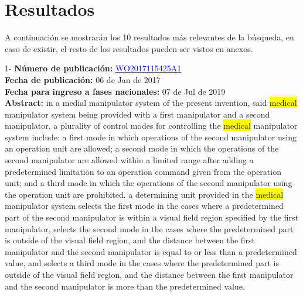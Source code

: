\chapter{Resultados}
 A continuación se mostrarán los 10 resultados más 
    relevantes de la búsqueda, en caso de existir, el resto de los resultados pueden ser vistos en anexos.
 
 \vspace{1cm}1- \textbf{Número de publicación:} \href{https://worldwide.espacenet.com/publicationDetails/biblio?DB=EPODOC&II=0&ND=3&adjacent=true&locale=en_EP&FT=D&date=20160331&CC=WO&NR=2017115425A1&KC=A1#}{\textcolor{blue}{WO2017115425A1}}\\ 
\textbf{Fecha de publicación:} 06 de Jan de 2017\\ 
\textbf{Fecha para ingreso a fases nacionales:} 07 de Jul de 2019\\ 
\textbf{Abstract:} in a medial manipulator system of the present invention, said \colorbox{yellow}{medical} manipulator system being provided with a first manipulator and a second manipulator, a plurality of control modes for controlling the \colorbox{yellow}{medical} manipulator system include: a first mode in which operations of the second manipulator using an operation unit are allowed; a second mode in which the operations of the second manipulator are allowed within a limited range after adding a predetermined limitation to an operation command given from the operation unit; and a third mode in which the operations of the second manipulator using the operation unit are prohibited. a determining unit provided in the \colorbox{yellow}{medical} manipulator system selects the first mode in the cases where a predetermined part of the second manipulator is within a visual field region specified by the first manipulator, selects the second mode in the cases where the predetermined part is outside of the visual field region, and the distance between the first manipulator and the second manipulator is equal to or less than a predetermined value, and selects a third mode in the cases where the predetermined part is outside of the visual field region, and the distance between the first manipulator and the second manipulator is more than the predetermined value.\\ 
 

